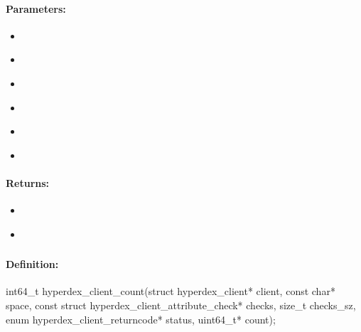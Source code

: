 \paragraph{Parameters:}
\begin{itemize}[noitemsep]
\item {}\\

\item {}\\

\item {}\\

\item {}\\

\item {}\\

\item {}\\

\end{itemize}

\paragraph{Returns:}
\begin{itemize}[noitemsep]
\item {}\\

\item {}\\

\end{itemize}

\pagebreak
\subsubsection{}
\label{api:c:count}


\paragraph{Definition:}
\begin{ccode}
int64_t hyperdex_client_count(struct hyperdex_client* client,
        const char* space,
        const struct hyperdex_client_attribute_check* checks, size_t checks_sz,
        enum hyperdex_client_returncode* status,
        uint64_t* count);
\end{ccode}

